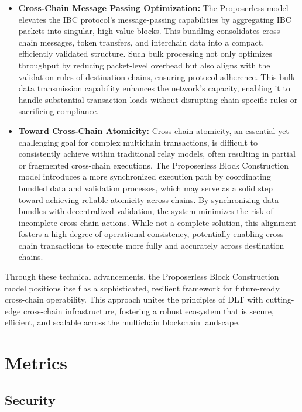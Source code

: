 \documentclass{article}
\begin{document}
\begin{itemize}
    \item \textbf{Cross-Chain Message Passing Optimization:} The Proposerless model elevates the IBC protocol's message-passing capabilities by aggregating IBC packets into singular, high-value blocks. This bundling consolidates cross-chain messages, token transfers, and interchain data into a compact, efficiently validated structure. Such bulk processing not only optimizes throughput by reducing packet-level overhead but also aligns with the validation rules of destination chains, ensuring protocol adherence. This bulk data transmission capability enhances the network's capacity, enabling it to handle substantial transaction loads without disrupting chain-specific rules or sacrificing compliance.
    \item \textbf{Toward Cross-Chain Atomicity:} Cross-chain atomicity, an essential yet challenging goal for complex multichain transactions, is difficult to consistently achieve within traditional relay models, often resulting in partial or fragmented cross-chain executions. The Proposerless Block Construction model introduces a more synchronized execution path by coordinating bundled data and validation processes, which may serve as a solid step toward achieving reliable atomicity across chains. By synchronizing data bundles with decentralized validation, the system minimizes the risk of incomplete cross-chain actions. While not a complete solution, this alignment fosters a high degree of operational consistency, potentially enabling cross-chain transactions to execute more fully and accurately across destination chains.
\end{itemize}

Through these technical advancements, the Proposerless Block Construction model positions itself as a sophisticated, resilient framework for future-ready cross-chain operability. This approach unites the principles of DLT with cutting-edge cross-chain infrastructure, fostering a robust ecosystem that is secure, efficient, and scalable across the multichain blockchain landscape.

\section{Metrics}

\subsection{Security}
\end{document}
